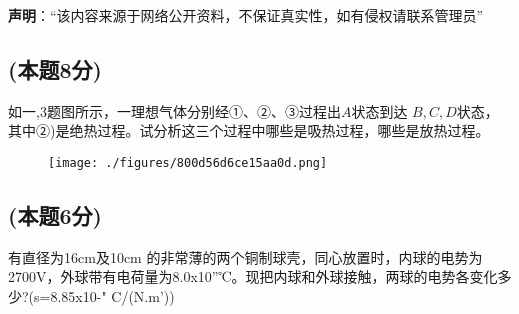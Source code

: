 
\textbf{声明}：“该内容来源于网络公开资料，不保证真实性，如有侵权请联系管理员”

\subsection{(本题8分)}
如一,3题图所示，一理想气体分别经①、②、③过程出$A$状态到达 $B,C,D$状态，其中②)是绝热过程。试分析这三个过程中哪些是吸热过程，哪些是放热过程。
\begin{figure}[ht]
\centering
\texttt{[image: ./figures/800d56d6ce15aa0d.png]}
\caption{} \label{fig_CD13_1}
\end{figure}
\subsection{(本题6分)}
有直径为16cm及10cm 的非常薄的两个铜制球壳，同心放置时，内球的电势为 2700V，外球带有电荷量为8.0x10”℃。现把内球和外球接触，两球的电势各变化多少?(s=8.85x10-" C/(N.m’))